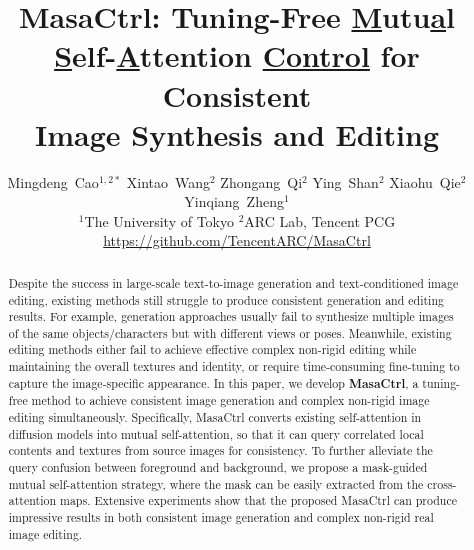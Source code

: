 \documentclass[10pt,twocolumn,letterpaper]{article}
\begin{document}
\title{MasaCtrl: Tuning-Free \underline{M}utu\underline{a}l \underline{S}elf-\underline{A}ttention \underline{Control} for Consistent \\Image Synthesis and Editing}

\author{
\vspace{0.2cm}
Mingdeng~Cao$^{1,2*}$\quad
Xintao~Wang$^2$\Envelope\quad
Zhongang~Qi$^2$\quad
Ying~Shan$^2$\quad
Xiaohu~Qie$^2$\quad
Yinqiang~Zheng$^1$\Envelope \\
$^1$The University of Tokyo \qquad $^2$ARC Lab, Tencent PCG \vspace{0.2cm} \\
\large\url{https://github.com/TencentARC/MasaCtrl}\vspace{-0.4cm}
}

\newcommand{\xt}[1]{{\color{red}{Xintao: #1}}}



\newcommand*{\method}{\mbox{MasaCtrl}}



\begin{abstract}
\let\thefootnote\relax{}
Despite the success in large-scale text-to-image generation and text-conditioned image editing, existing methods still struggle to produce consistent generation and editing results. For example, generation approaches usually fail to synthesize multiple images of the same objects/characters but with different views or poses. Meanwhile, existing editing methods either fail to achieve effective complex non-rigid editing while maintaining the overall textures and identity, or require time-consuming fine-tuning to capture the image-specific appearance. In this paper, we develop \textbf{MasaCtrl}, a tuning-free method to achieve consistent image generation and complex non-rigid image editing simultaneously. Specifically, MasaCtrl converts existing self-attention in diffusion models into mutual self-attention, so that it can query correlated local contents and textures from source images for consistency. To further alleviate the query confusion between foreground and background, we propose a mask-guided mutual self-attention strategy, where the mask can be easily extracted from the cross-attention maps. Extensive experiments show that the proposed MasaCtrl can produce impressive results in both consistent image generation and complex non-rigid real image editing.
\end{abstract}
\end{document}
